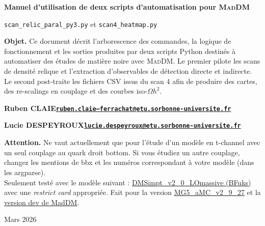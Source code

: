 \documentclass[11pt,a4paper]{article}
\newcommand{\script}[1]{\texttt{#1}}
\newcommand{\mad}{\textsc{MadDM}}
\begin{document}

\begin{titlepage}
\centering
\vspace*{2.2cm}
{\Huge\bfseries Manuel d'utilisation de deux scripts d'automatisation pour \mad\par}
\vspace{0.5cm}
{\Large \script{scan\_relic\_paral\_py3.py} et \script{scan4\_heatmap.py}\par}
\vspace{1.2cm}

\begin{minipage}{0.88\textwidth}
\small
\textbf{Objet.} Ce document décrit l'arborescence des commandes, la logique de fonctionnement et les sorties produites par deux scripts Python destinés à automatiser des études de matière noire avec \mad. Le premier pilote les scans de densité relique et l'extraction d'observables de détection directe et indirecte. Le second post-traite les fichiers CSV issus du scan 4 afin de produire des cartes, des re-scalings en couplage et des courbes iso-$\Omega h^2$.
\end{minipage}

\vspace{1.5cm}
{\normalsize\sffamily\bfseries Ruben CLAIE\quad\href{mailto:ruben.claie--ferrachat@etu.sorbonne-universite.fr}{\texttt{ruben.claie--ferrachat@etu.sorbonne-universite.fr}}\par}
\vspace{0.7cm}
{\normalsize\sffamily\bfseries Lucie DESPEYROUX\quad\href{mailto:lucie.despeyroux@etu.sorbonne-universite.fr}{\texttt{lucie.despeyroux@etu.sorbonne-universite.fr}}\par}
\vspace{2cm}

\begin{minipage}{0.88\textwidth}
\small
{\normalsize\color{red}\textbf{Attention.} Ne vaut actuellement que pour l'étude d'un modèle en t-channel avec un seul couplage au quark droit bottom. Si vous étudiez un autre couplage, changez les mentions de bbx et les numéros correspondant à votre modèle (dans les argparse). \\

Seulement testé avec le modèle suivant : \href{https://github.com/BFuks/DMSimpt/tree/main/DMSimpt_v2_0_LOmassive}{DMSimpt\_v2\_0\_LOmassive (BFuks)} avec une \emph{restrict card} appropriée. Fait pour la version \href{https://github.com/mg5amcnlo/mg5amcnlo/releases/tag/v2.9.27}{MG5\_aMC\_v2\_9\_27} et la \href{https://github.com/mg5amcnlo/maddm/tree/dev}{version dev de MadDM}.}
\end{minipage}

\vfill
{\large Mars 2026\par}
\end{titlepage}
\clearpage
{}
\setcounter{page}{1}
\end{document}
